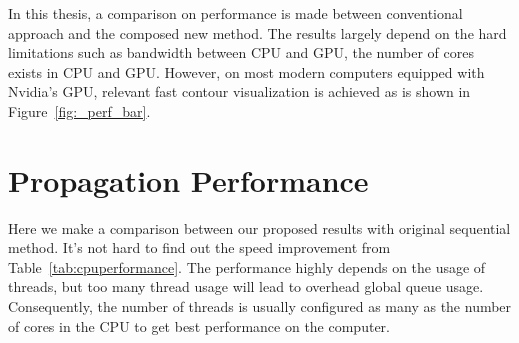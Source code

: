 \documentclass[11pt, b5paper]{report}
\begin{document}

In this thesis, a comparison on performance is made between conventional 
approach and the composed new method. The results largely depend
on the hard limitations such as bandwidth between CPU and GPU,
the number of cores exists in CPU and GPU. However, on most modern 
computers equipped with Nvidia's GPU, relevant fast contour visualization
is achieved as is shown in Figure~\ref{fig:_perf_bar}.

\section{Propagation Performance}
Here we make a comparison between our proposed results with original 
sequential method. It's not hard to find out the speed improvement from 
Table~\ref{tab:cpuperformance}. The performance highly depends on the usage 
of threads, but too many thread usage will lead to overhead global queue 
usage. Consequently, the number of threads is usually configured as many as 
the number of cores in the CPU to get best performance on the computer.


\end{document}
